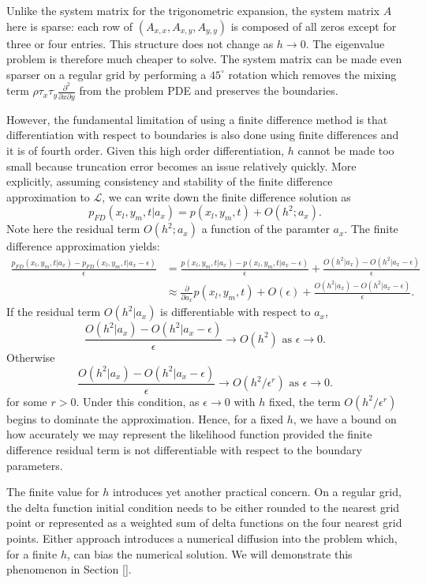 \documentclass[10pt]{article}
\begin{document}
Unlike the system matrix for the trigonometric expansion, the system
matrix $A$ here is sparse: each row of $(A_{x,x}, A_{x,y}, A_{y,y})$
is composed of all zeros except for three or four entries. This
structure does not change as $h \to 0$. The eigenvalue problem is
therefore much cheaper to solve. The system matrix can be made even
sparser on a regular grid by performing a $45^{\circ}$ rotation which
removes the mixing term
$\rho\tau_x \tau_y\frac{\partial^2}{\partial x \partial y}$ from
the problem PDE and preserves the boundaries.

However, the fundamental limitation of using a finite difference
method is that differentiation with respect to boundaries is also done
using finite differences and it is of fourth order. Given this high
order differentiation, $h$ cannot be made too small because truncation
error becomes an issue relatively quickly. More explicitly, assuming
consistency and stability of the finite difference approximation to
$\mathcal{L}$, we can write down the finite difference solution as
\[
  p_{FD}(x_l,y_m,t | a_x) = p(x_l,y_m,t) + O(h^2; a_x).
\]
Note here the residual term $O(h^2; a_x)$ a function of the paramter
$a_x$. The finite difference approximation yields:
\begin{align*}
  \frac{p_{FD}(x_l,y_m,t | a_x) - p_{FD}(x_l,y_m,t | a_x - \epsilon)}{\epsilon} &= \frac{p(x_l,y_m,t | a_x) - p(x_l,y_m,t | a_x - \epsilon)}{\epsilon} + \frac{O(h^2 | a_x) - O(h^2 | a_x - \epsilon)}{\epsilon} \\
      &\approx \frac{\partial}{\partial a_x} p(x_l,y_m,t) + O(\epsilon) + \frac{O(h^2 | a_x) - O(h^2 | a_x - \epsilon)}{\epsilon}.
\end{align*}
If the residual term $O(h^2 | a_x)$ is differentiable with respect to
$a_x$,
\[
  \frac{O(h^2 | a_x) - O(h^2 | a_x - \epsilon)}{\epsilon} \to O(h^2) \mbox{ as } \epsilon \to 0.
\]
Otherwise
\[
  \frac{O(h^2 | a_x) - O(h^2 | a_x - \epsilon)}{\epsilon} \to O(h^2/\epsilon^r) \mbox{ as } \epsilon \to 0.
\]
for some $r > 0$. Under this condition, as $\epsilon \to 0$ with $h$
fixed, the term $O(h^2/\epsilon^r)$ begins to dominate the
approximation. Hence, for a fixed $h$, we have a bound on how
accurately we may represent the likelihood function provided the
finite difference residual term is not differentiable with respect to
the boundary parameters.

The finite value for $h$ introduces yet another practical concern. On
a regular grid, the delta function initial condition needs to be
either rounded to the nearest grid point or represented as a weighted
sum of delta functions on the four nearest grid points. Either
approach introduces a numerical diffusion into the problem which, for
a finite $h$, can bias the numerical solution. We will demonstrate
this phenomenon in Section [].
\end{document}

